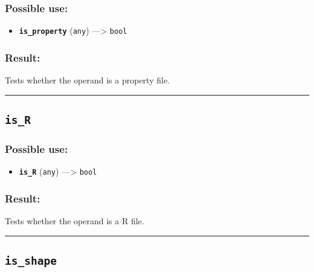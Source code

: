 \documentclass[]{book}
\providecommand{\tightlist}{%
  \setlength{\itemsep}{0pt}\setlength{\parskip}{0pt}}
\theoremstyle{definition}
\theoremstyle{definition}
\theoremstyle{definition}
\theoremstyle{remark}
\begin{document}
\subsubsection{Possible use:}\label{possible-use-300}

\begin{itemize}
\tightlist
\item
  \textbf{\texttt{is\_property}} (\texttt{any}) ---\textgreater{}
  \texttt{bool}
\end{itemize}

\subsubsection{Result:}\label{result-290}

Tests whether the operand is a property file.

\begin{center}\rule{0.5\linewidth}{\linethickness}\end{center}

\subsection{\texorpdfstring{\texttt{is\_R}}{is\_R}}\label{is_r}

\subsubsection{Possible use:}\label{possible-use-301}

\begin{itemize}
\tightlist
\item
  \textbf{\texttt{is\_R}} (\texttt{any}) ---\textgreater{} \texttt{bool}
\end{itemize}

\subsubsection{Result:}\label{result-291}

Tests whether the operand is a R file.

\begin{center}\rule{0.5\linewidth}{\linethickness}\end{center}

\subsection{\texorpdfstring{\texttt{is\_shape}}{is\_shape}}\label{is_shape}
\end{document}
